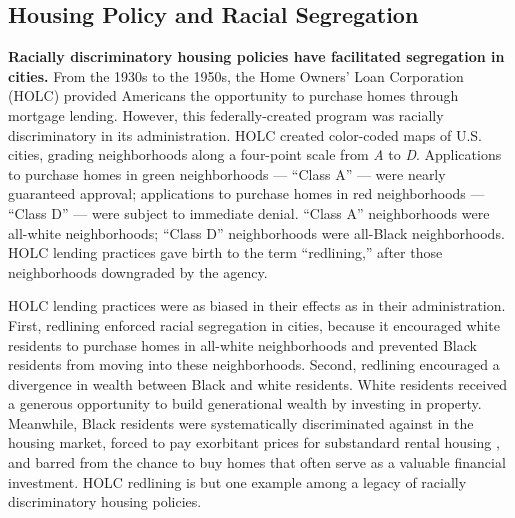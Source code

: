 \documentclass[paper=letter, fontsize=12pt]{scrartcl} %
\begin{document}
\subsection{Housing Policy and Racial Segregation}
\textbf{Racially discriminatory housing policies have facilitated segregation in cities.} From the 1930s to the 1950s, the Home Owners' Loan Corporation (HOLC) provided Americans the opportunity to purchase homes through mortgage lending. However, this federally-created program was racially discriminatory in its administration. HOLC created color-coded maps of U.S. cities, grading neighborhoods along a four-point scale from \textit{A} to \textit{D}. Applications to purchase homes in green neighborhoods --- ``Class A'' --- were nearly guaranteed approval; applications to purchase homes in red neighborhoods --- ``Class D'' --- were subject to immediate denial. ``Class A'' neighborhoods were all-white neighborhoods; ``Class D'' neighborhoods were all-Black neighborhoods. HOLC lending practices gave birth to the term ``redlining,'' after those neighborhoods downgraded by the agency. \cite{rothstein}\par

HOLC lending practices were as biased in their effects as in their administration. First, redlining enforced racial segregation in cities, because it encouraged white residents to purchase homes in all-white neighborhoods and prevented Black residents from moving into these neighborhoods. Second, redlining encouraged a divergence in wealth between Black and white residents. White residents received a generous opportunity to build generational wealth by investing in property. Meanwhile, Black residents were systematically discriminated against in the housing market, forced to pay exorbitant prices for substandard rental housing \cite{orfield}, and barred from the chance to buy homes that often serve as a valuable financial investment. HOLC redlining is but one example among a legacy of racially discriminatory housing policies.\par
\end{document}
